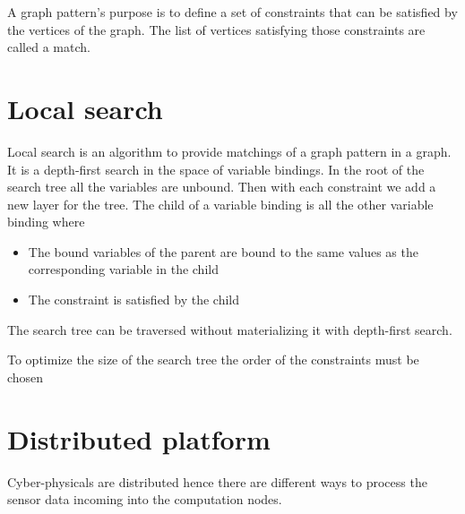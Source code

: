 A graph pattern's purpose is to define a set of constraints that can be satisfied by the vertices of the graph. The list of vertices satisfying those constraints are called a match.

\section{Local search}

Local search is an algorithm to provide matchings of a graph pattern in a graph. It is a depth-first search in the space of variable bindings. In the root of the search tree all the variables are unbound. Then with each constraint we add a new layer for the tree. The child of a variable binding is all the other variable binding where 
\begin{itemize}
	\item The bound variables of the parent are bound to the same values as the corresponding variable in the child
	\item The constraint is satisfied by the child
\end{itemize}

The search tree can be traversed without materializing it with depth-first search. 

To optimize the size of the search tree the order of the constraints must be chosen 

\section{Distributed platform}


Cyber-physicals are distributed hence there are different ways to process the sensor data incoming into the computation nodes. 






